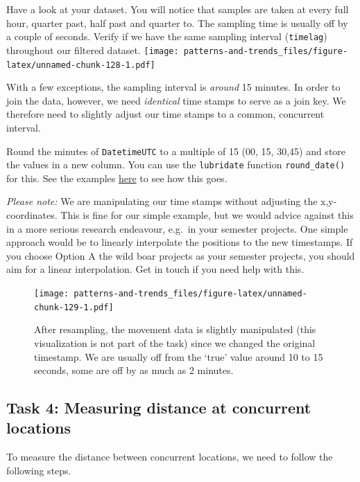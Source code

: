 \documentclass[]{book}
\begin{document}
Have a look at your dataset. You will notice that samples are taken at every full hour, quarter past, half past and quarter to. The sampling time is usually off by a couple of seconds. Verify if we have the same sampling interval (\texttt{timelag}) throughout our filtered dataset.
\texttt{[image: patterns-and-trends\_files/figure-latex/unnamed-chunk-128-1.pdf]}

With a few exceptions, the sampling interval is \emph{around} 15 minutes. In order to join the data, however, we need \emph{identical} time stamps to serve as a join key. We therefore need to slightly adjust our time stamps to a common, concurrent interval.

Round the minutes of \texttt{DatetimeUTC} to a multiple of 15 (00, 15, 30,45) and store the values in a new column. You can use the \texttt{lubridate} function \texttt{round\_date()} for this. See the examples \href{https://lubridate.tidyverse.org/reference/round_date.html}{here} to see how this goes.

\emph{Please note:} We are manipulating our time stamps without adjusting the x,y-coordinates. This is fine for our simple example, but we would advice against this in a more serious research endeavour, e.g.~in your semester projects. One simple approach would be to linearly interpolate the positions to the new timestamps. If you choose Option A the wild boar projects as your semester projects, you should aim for a linear interpolation. Get in touch if you need help with this.

\begin{figure}
\centering
\texttt{[image: patterns-and-trends\_files/figure-latex/unnamed-chunk-129-1.pdf]}
\caption{\label{fig:unnamed-chunk-129}After resampling, the movement data is slightly manipulated (this visualization is not part of the task) since we changed the original timestamp. We are usually off from the `true' value around 10 to 15 seconds, some are off by as much as 2 minutes.}
\end{figure}

\hypertarget{task-4-measuring-distance-at-concurrent-locations}{%
\subsection{Task 4: Measuring distance at concurrent locations}\label{task-4-measuring-distance-at-concurrent-locations}}

To measure the distance between concurrent locations, we need to follow the following steps.
\end{document}
